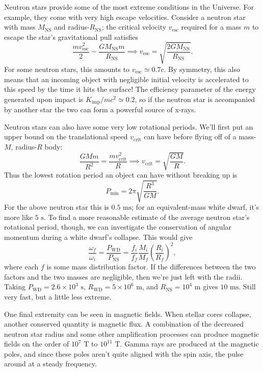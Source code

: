 \documentclass[../a062main.tex]{subfiles}
\begin{document}
Neutron stars provide some of the most extreme conditions in the Universe.
For example, they come with very high escape velocities.
Consider a neutron star with mass $M_\textrm{NS}$ and radius-$R_\textrm{NS}$; the critical velocity $v_\textrm{esc}$ required for a mass $m$ to escape the star's gravitational pull satisfies
\[ \frac{mv_\textrm{esc}^2}{2} - \frac{GM_\textrm{NS}m}{R_\textrm{NS}} \implies v_\textrm{esc} = \sqrt{\frac{2GM_\textrm{NS}}{R_\textrm{NS}}}. \]
For some neutron stars, this amounts to $v_\textrm{esc} \simeq 0.7c$.
By symmetry, this also means that an incoming object with negligible initial velocity is accelerated to this speed by the time it hits the surface!
The efficiency parameter of the energy generated upon impact is $K_\textrm{imp} / mc^2 \simeq 0.2$, so if the neutron star is accompanied by another star the two can form a powerful source of x-rays.

Neutron stars can also have some very low rotational periods.
We'll first put an upper bound on the translational speed $v_\textrm{crit}$ can have before flying off of a mass-$M$, radius-$R$ body:
\[ \frac{GMm}{R^2} = \frac{mv_\textrm{crit}^2}{R} \implies v_\textrm{crit} = \sqrt{\frac{GM}{R}}. \]
Thus the lowest rotation period an object can have without breaking up is
\[ P_\textrm{min} = 2\pi \sqrt{\frac{R^3}{GM}}. \]
For the above neutron star this is $0.5 \textrm{ ms}$; for an equivalent-mass white dwarf, it's more like $5\textrm{ s}$.
To find a more reasonable estimate of the average neutron star's rotational period, though, we can investigate the conservation of angular momentum during a white dwarf's collapse.
This would give
\[ \frac{\omega_f}{\omega_i} = \frac{P_\textrm{WD}}{P_\textrm{NS}} = \frac{f_i}{f_f} \frac{M_i}{M_f} \left( \frac{R_i}{R_f} \right)^2, \]
where each $f$ is some mass distribution factor.
If the differences between the two factors and the two masses are negligible, then we're just left with the radii.
Taking $P_\textrm{WD} = 2.6 \times 10^{3} \textrm{ s}$, $R_\textrm{WD} = 5 \times 10^{6} \textrm{ m}$, and $R_\textrm{NS} = 10^{4} \textrm{ m}$ gives $10 \textrm{ ms}$.
Still very fast, but a little less extreme.

One final extremity can be seen in magnetic fields.
When stellar cores collapse, another conserved quantity is magnetic flux.
A combination of the decreased neutron star radius and some other amplification processes can produce magnetic fields on the order of $10^{7} \text{ T}$ to $10^{11} \text{ T}$.
Gamma rays are produced at the magnetic poles, and since these poles aren't quite aligned with the spin axis, the pulse around at a steady frequency.
\end{document}
